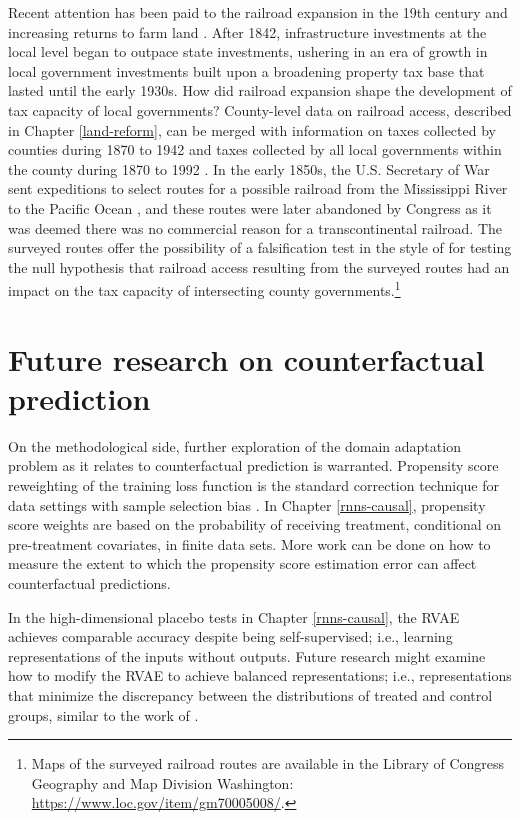 Recent attention has been paid to the railroad expansion in the 19th century and increasing returns to farm land  \citep{donaldson2016railroads}. After 1842, infrastructure investments at the local level began to outpace state investments, ushering in an era of growth in local government investments built upon a broadening property tax base that lasted until the early 1930s. How did railroad expansion shape the development of tax capacity of local governments? County-level data on railroad access, described in Chapter \ref{land-reform}, can be merged with information on taxes collected by counties during 1870 to 1942 and taxes collected by all local governments within the county during 1870 to 1992 \citep{rhode2003assessing}. In the early 1850s, the U.S. Secretary of War sent expeditions to select routes for a possible railroad from the Mississippi River to the Pacific Ocean \citep{blake1857geological,baird1858reports}, and these routes were later abandoned by Congress as it was deemed there was no commercial reason for a transcontinental railroad. The surveyed routes offer the possibility of a falsification test in the style of \citep{donaldson2018railroads} for testing the null hypothesis that railroad access resulting from the surveyed routes had an impact on the tax capacity of intersecting county governments.\footnote{Maps of the surveyed railroad routes are available in the Library of Congress Geography and Map Division Washington: \url{https://www.loc.gov/item/gm70005008/}.}

\section{Future research on counterfactual prediction}

On the methodological side, further exploration of the domain adaptation problem as it relates to counterfactual prediction is warranted. Propensity score reweighting of the training loss function is the standard correction technique for data settings with sample selection bias \citep{cortes2008sample}. In Chapter \ref{rnns-causal}, propensity score weights are based on the probability of receiving treatment, conditional on pre-treatment covariates, in finite data sets. More work can be done on how to measure the extent to which the propensity score estimation error can affect counterfactual predictions. 

In the high-dimensional placebo tests in Chapter \ref{rnns-causal}, the RVAE achieves comparable accuracy despite being self-supervised; i.e., learning representations of the inputs without outputs. Future research might examine how to modify the RVAE to achieve balanced representations; i.e., representations that minimize the discrepancy between the distributions of treated and control groups, similar to the work of \citet{johansson2016learning}.


